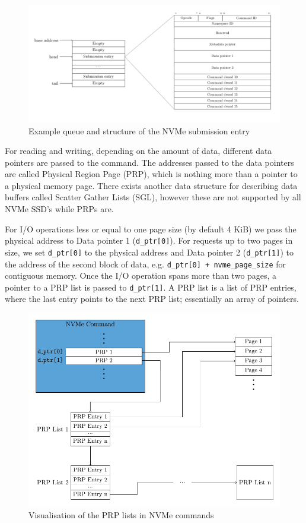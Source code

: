 \begin{figure}
  \centering
    \includegraphics[width=\textwidth]{figures/nvme-queue}
    \caption{Example queue and structure of the NVMe submission entry}
    \label{fig:nvme-queue}
\end{figure}


For reading and writing, depending on the amount of data, different data pointers are passed to the command. The addresses passed to the data pointers are called Physical Region Page (PRP), which is nothing more than a pointer to a physical memory page. There exists another data structure for describing data buffers called Scatter Gather Lists (SGL), however these are not supported by all NVMe SSD's while PRPs are.

For I/O operations less or equal to one page size (by default 4 KiB) we pass the physical address to Data pointer 1 (\texttt{d\_ptr[0]}). For requests up to two pages in size, we set \texttt{d\_ptr[0]} to the physical address and Data pointer 2 (\texttt{d\_ptr[1]}) to the address of the second block of data, e.g. \texttt{d\_ptr[0] + nvme\_page\_size} for contiguous memory. Once the I/O operation spans more than two pages, a pointer to a PRP list is passed to \texttt{d\_ptr[1]}. A PRP list is a list of PRP entries, where the last entry points to the next PRP list; essentially an array of pointers.

\begin{figure}
  \centering
    \includegraphics[width=\textwidth]{figures/prp-list}
    \caption{Visualisation of the PRP lists in NVMe commands}
    \label{fig:prp-list}
\end{figure}

